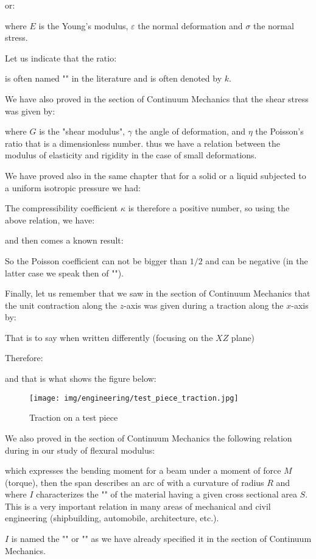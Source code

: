 	or:
	
	where $E$ is the Young's modulus, $\varepsilon$ the normal deformation and $\sigma$ the normal stress. 

	Let us indicate that the ratio:
	
	is often named "" in the literature and is often denoted by $k$.

	We have also proved in the section of Continuum Mechanics that the shear stress was given by:
	
	where $G$ is the "shear modulus", $\gamma$ the angle of deformation, and $\eta$ the Poisson's ratio that is a dimensionless number. thus we have a relation between the modulus of elasticity and rigidity in the case of small deformations.

	We have proved also in the same chapter that for a solid or a liquid subjected to a uniform isotropic pressure we had:
	
	The compressibility coefficient $\kappa$ is therefore  a positive number, so using the above relation, we have:
	
	and then comes a known result:
	
	So the Poisson coefficient can not be bigger than $1/2$ and can be negative (in the latter case we speak then of "").

	Finally, let us remember that we saw in the section of Continuum Mechanics that the unit contraction along the $z$-axis was given during a traction along the $x$-axis by:
	
	That is to say when written differently (focusing on the $XZ$ plane)
	
	Therefore:
	
	and that is what shows the figure below:
	\begin{figure}[H]
		\centering
		\texttt{[image: img/engineering/test\_piece\_traction.jpg]}
		\caption{Traction on a test piece}
	\end{figure}
	We also proved in the section of Continuum Mechanics the following relation during in our study of flexural modulus:
	
	which expresses the bending moment for a beam under a moment of force $M$ (torque), then the span describes an arc of with a curvature of radius $R$ and where $I$ characterizes the "" of the material having a given cross sectional area $S$. This is a very important relation in many areas of mechanical and civil engineering (shipbuilding, automobile, architecture, etc.).
	\begin{tcolorbox}[title=Remark,colframe=black,arc=10pt]
	$I$ is named the "" or "" as we have already specified it in the section of Continuum Mechanics.
	\end{tcolorbox}
	
